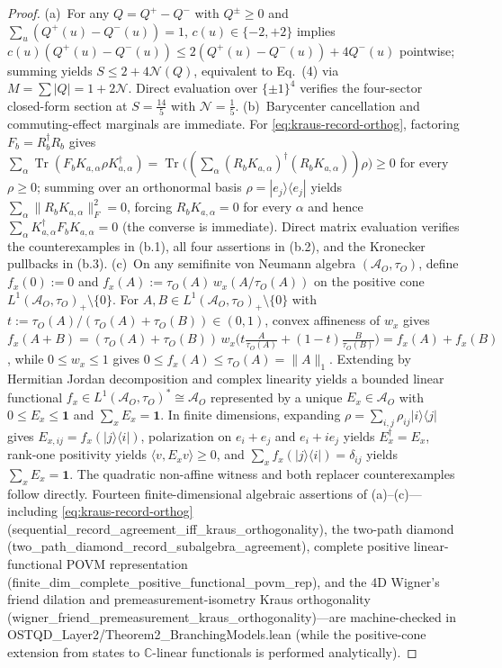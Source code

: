 \documentclass[11pt,a4paper]{article}
\theoremstyle{definition}
\theoremstyle{remark}
\newcommand{\Tr}{\operatorname{Tr}}
\newcommand{\cA}{\mathcal{A}}
\newcommand{\cN}{\mathcal{N}}
\newcommand{\bbC}{\mathbb{C}}
\newcommand{\1}{\mathbf{1}}
\newcommand{\normF}[1]{\|#1\|_F}
\newcommand{\code}[1]{{\scriptsize\ttfamily #1}}
\begin{document}
\begin{proof}
(a)~For any $Q=Q^+-Q^-$ with $Q^\pm\ge 0$ and $\sum_u(Q^+(u)-Q^-(u))=1$, $c(u)\in\{-2,+2\}$ implies $c(u)(Q^+(u)-Q^-(u))\le 2(Q^+(u)-Q^-(u))+4Q^-(u)$ pointwise; summing yields $S\le 2+4\cN(Q)$, equivalent to \cite{Oas2014} Eq.~(4) via $M=\sum|Q|=1+2\cN$. Direct evaluation over $\{\pm 1\}^4$ verifies the four-sector closed-form section at $S=\frac{14}{5}$ with $\cN=\frac{1}{5}$.
(b)~Barycenter cancellation and commuting-effect marginals are immediate. For \eqref{eq:kraus-record-orthog}, factoring $F_b=R_b^\dagger R_b$ gives $\sum_\alpha\Tr(F_b K_{a,\alpha}\rho K_{a,\alpha}^\dagger)=\Tr\bigl((\sum_\alpha(R_b K_{a,\alpha})^\dagger(R_b K_{a,\alpha}))\rho\bigr)\ge 0$ for every $\rho\ge 0$; summing over an orthonormal basis $\rho=|e_j\rangle\langle e_j|$ yields $\sum_\alpha\normF{R_b K_{a,\alpha}}^2=0$, forcing $R_b K_{a,\alpha}=0$ for every $\alpha$ and hence $\sum_\alpha K_{a,\alpha}^\dagger F_b K_{a,\alpha}=0$ (the converse is immediate). Direct matrix evaluation verifies the counterexamples in (b.1), all four assertions in (b.2), and the Kronecker pullbacks in (b.3).
(c)~On any semifinite von Neumann algebra $(\cA_O,\tau_O)$, define $f_x(0):=0$ and $f_x(A):=\tau_O(A)\,w_x(A/\tau_O(A))$ on the positive cone $L^1(\cA_O,\tau_O)_+\setminus\{0\}$. For $A,B\in L^1(\cA_O,\tau_O)_+\setminus\{0\}$ with $t:=\tau_O(A)/(\tau_O(A)+\tau_O(B))\in(0,1)$, convex affineness of $w_x$ gives $f_x(A+B)=(\tau_O(A)+\tau_O(B))\,w_x\bigl(t\frac{A}{\tau_O(A)}+(1-t)\frac{B}{\tau_O(B)}\bigr)=f_x(A)+f_x(B)$, while $0\le w_x\le 1$ gives $0\le f_x(A)\le\tau_O(A)=\|A\|_1$. Extending by Hermitian Jordan decomposition and complex linearity yields a bounded linear functional $f_x\in L^1(\cA_O,\tau_O)^*\cong\cA_O$ represented by a unique $E_x\in\cA_O$ with $0\le E_x\le\1$ and $\sum_x E_x=\1$. In finite dimensions, expanding $\rho=\sum_{i,j}\rho_{ij}|i\rangle\langle j|$ gives $E_{x,ij}=f_x(|j\rangle\langle i|)$, polarization on $e_i+e_j$ and $e_i+ie_j$ yields $E_x^\dagger=E_x$, rank-one positivity yields $\langle v,E_x v\rangle\ge 0$, and $\sum_x f_x(|j\rangle\langle i|)=\delta_{ij}$ yields $\sum_x E_x=\1$. The quadratic non-affine witness and both replacer counterexamples follow directly. Fourteen finite-dimensional algebraic assertions of (a)--(c)---including \eqref{eq:kraus-record-orthog} (\code{sequential\_\allowbreak record\_\allowbreak agreement\_\allowbreak iff\_\allowbreak kraus\_\allowbreak orthogonality}), the two-path diamond (\code{two\_\allowbreak path\_\allowbreak diamond\_\allowbreak record\_\allowbreak subalgebra\_\allowbreak agreement}), complete positive linear-functional POVM representation (\code{finite\_\allowbreak dim\_\allowbreak complete\_\allowbreak positive\_\allowbreak functional\_\allowbreak povm\_\allowbreak rep}), and the 4D Wigner's friend dilation and premeasurement-isometry Kraus orthogonality (\code{wigner\_\allowbreak friend\_\allowbreak premeasurement\_\allowbreak kraus\_\allowbreak orthogonality})---are machine-checked in \code{OSTQD\_Layer2/\allowbreak Theorem2\_\allowbreak BranchingModels.lean} (while the positive-cone extension from states to $\bbC$-linear functionals is performed analytically).
\end{proof}
\end{document}
